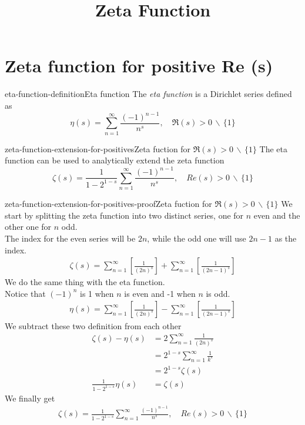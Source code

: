 \documentclass[preview]{standalone}
\newcommand{\exceptone}{
    \,\backslash\,\{1\}
}
\begin{document}
\title{Zeta Function}
\genpage

\section{Zeta function for positive Re (s)}

\begin{snippetdefinition}{eta-function-definition}{Eta function}
    The \textit{eta function} is a Dirichlet series defined as
    \[
        \eta(s)=\sum_{n=1}^{\infty}\frac{{(-1)}^{n-1}}{n^s},
        \quad \Re(s)>0\exceptone
    \]
\end{snippetdefinition}

\begin{snippettheorem}{zeta-function-extension-for-positives}{Zeta fuction for \(\Re(s) > 0 \exceptone\)}
    The eta function can be used to analytically extend the zeta function
    \[
        \zeta(s)=\frac{1}{1-2^{1-s}}\sum_{n=1}^{\infty}\frac{{(-1)}^{n-1}}{n^s},
        \quad Re(s)>0\exceptone
    \]
\end{snippettheorem}

\begin{snippetproof}{zeta-function-extension-for-positives-proof}{Zeta fuction for \(\Re(s) > 0 \exceptone\)}
    We start by splitting the zeta function into two distinct series, one for \(n\) even and the other one for \(n\) odd.
    \\
    The index for the even series will be \(2n\), while the odd one will use \(2n-1\) as the index.
    \begin{align*}
        \zeta(s)=
        \sum_{n=1}^{\infty}\left[\frac{1}{{(2n)}^s}\right]+
        \sum_{n=1}^{\infty}\left[\frac{1}{{(2n-1)}^s}\right]
    \end{align*}
    We do the same thing with the eta function.
    \\
    Notice that \({(-1)}^n\) is 1 when \(n\) is even and -1 when \(n\) is odd.
    \begin{align*}
        \eta(s)=
        \sum_{n=1}^{\infty}\left[\frac{1}{{(2n)}^s}\right]-
        \sum_{n=1}^{\infty}\left[\frac{1}{{(2n-1)}^s}\right]
    \end{align*}
    We subtract these two definition from each other
    \begin{align*}
        \zeta(s)-\eta(s)&=
        2\sum_{n=1}^{\infty}\frac{1}{{(2n)}^s}
        \\
        &=2^{1-s}\sum_{n=1}^{\infty}\frac{1}{k^s}
        \\
        &=2^{1-s}\zeta(s)
        \\
        \frac{1}{1-2^{1-s}}\eta(s)&=\zeta(s)
    \end{align*}
    We finally get
    \begin{align*}
        \zeta(s)=\frac{1}{1-2^{1-s}}\sum_{n=1}^{\infty}\frac{{(-1)}^{n-1}}{n^s},
        \quad Re(s)>0\exceptone
    \end{align*}
\end{snippetproof}
\end{document}
